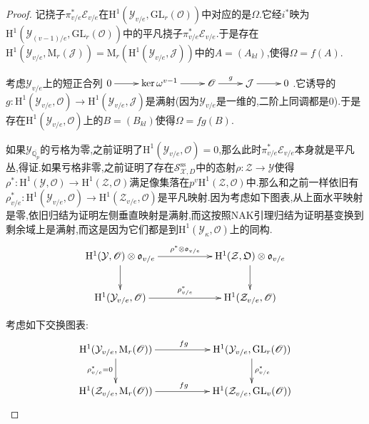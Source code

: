\begin{enumerate}
\begin{proof}
    	记挠子$\pi^*_{v/e}\mathcal{E}_{v/e}$在$\mathrm{H}^1(\mathcal{Y}_{v/e},\mathrm{GL}_r(\mathscr{O}))$中对应的是$\Omega$.它经$i^*$映为$\mathrm{H}^1(\mathcal{Y}_{(v-1)/e},\mathrm{GL}_r(\mathscr{O}))$中的平凡挠子$\pi^*_{v/e}\mathcal{E}_{v/e}$.于是存在$\mathrm{H}^1(\mathcal{Y}_{v/e},\mathrm{M}_r(\mathcal{J}))=\mathrm{M}_r(\mathrm{H}^1(\mathcal{Y}_{v/e},\mathcal{J}))$中的$A=(A_{kl})$,使得$\Omega=f(A)$.
    	
    	\qquad
    	
    	考虑$\mathcal{Y}_{v/e}$上的短正合列$\xymatrix{0\ar[r]&\ker\omega^{v-1}\ar[r]&\mathscr{O}\ar[r]^g&\mathcal{J}\ar[r]&0}$.它诱导的$g:\mathrm{H}^1(\mathcal{Y}_{v/e},\mathscr{O})\to\mathrm{H}^1(\mathcal{Y}_{v/e},\mathcal{J})$是满射(因为$\mathcal{Y}_{v/e}$是一维的,二阶上同调都是0).于是存在$\mathrm{H}^1(\mathcal{Y}_{v/e},\mathscr{O})$上的$B=(B_{kl})$使得$\Omega=fg(B)$.
    	
    	\qquad
    	
    	如果$\mathcal{Y}_{\overline{\mathbb{Q}_p}}$的亏格为零,之前证明了$\mathrm{H}^1(\mathcal{Y}_{v/e},\mathscr{O})=0$,那么此时$\pi^*_{v/e}\mathcal{E}_{v/e}$本身就是平凡丛,得证.如果亏格非零,之前证明了存在$\mathcal{S}_{\mathcal{X},D}^{\mathrm{ss}}$中的态射$\rho:\mathcal{Z}\to\mathcal{Y}$使得$\rho^*:\mathrm{H}^1(\mathcal{Y},\mathscr{O})\to\mathrm{H}^1(\mathcal{Z},\mathscr{O})$满足像集落在$p^v\mathrm{H}^1(\mathcal{Z},\mathscr{O})$中.那么和之前一样依旧有$\rho^*_{v/e}:\mathrm{H}^1(\mathcal{Y}_{v/e},\mathscr{O})\to\mathrm{H}^1(\mathcal{Z}_{v/e},\mathscr{O})$是平凡映射.因为考虑如下图表,从上面水平映射是零,依旧归结为证明左侧垂直映射是满射,而这按照NAK引理归结为证明基变换到剩余域上是满射,而这是因为它们都是到$\mathrm{H}^1(\mathcal{Y}_{\kappa},\mathscr{O})$上的同构.
    	$$\xymatrix{\mathrm{H}^1(\mathcal{Y},\mathscr{O})\otimes\mathfrak{o}_{v/e}\ar[rr]^{\rho^*\otimes\mathfrak{o}_{v/e}}\ar[d]&&\mathrm{H}^1(\mathcal{Z},\mathfrak{O})\otimes\mathfrak{o}_{v/e}\ar[d]\\\mathrm{H}^1(\mathcal{Y}_{v/e},\mathscr{O})\ar[rr]^{\rho_{v/e}^*}&&\mathrm{H}^1(\mathcal{Z}_{v/e},\mathscr{O})}$$
    	
    	考虑如下交换图表:
    	$$\xymatrix{\mathrm{H}^1(\mathcal{Y}_{v/e},\mathrm{M}_r(\mathscr{O}))\ar[rr]^{fg}\ar[d]_{\rho^*_{v/e}=0}&&\mathrm{H}^1(\mathcal{Y}_{v/e},\mathrm{GL}_r(\mathscr{O}))\ar[d]^{\rho^*_{v/e}}\\\mathrm{H}^1(\mathcal{Z}_{v/e},\mathrm{M}_r(\mathscr{O}))\ar[rr]^{fg}&&\mathrm{H}^1(\mathcal{Z}_{v/e},\mathrm{GL}_v(\mathscr{O}))}$$
    	

\end{proof}
\end{enumerate}
